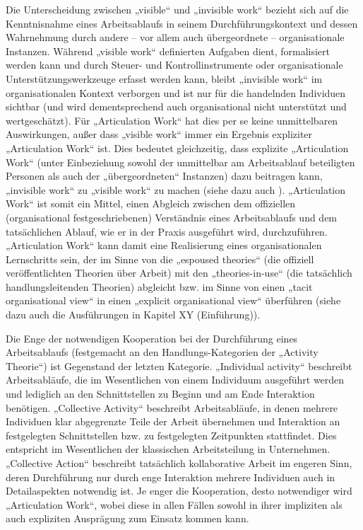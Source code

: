 Die Unterscheidung zwischen „visible“ und „invisible work“ bezieht sich auf die Kenntnisnahme eines Arbeitsablaufs in seinem Durchführungskontext und dessen Wahrnehmung durch andere -- vor allem auch übergeordnete -- organisationale Instanzen. Während „visible work“ definierten Aufgaben dient, formalisiert werden kann und durch Steuer- und Kontrollinstrumente oder organisationale Unterstützungswerkzeuge erfasst werden kann, bleibt „invisible work“ im organisationalen Kontext verborgen und ist nur für die handelnden Individuen sichtbar (und wird dementsprechend auch organisational nicht unterstützt und wertgeschätzt). Für „Articulation Work“ hat dies per se keine unmittelbaren Auswirkungen, außer dass „visible work“ immer ein Ergebnis expliziter „Articulation Work“ ist. Dies bedeutet gleichzeitig, dass explizite „Articulation Work“ (unter Einbeziehung sowohl der unmittelbar am Arbeitsablauf beteiligten Personen als auch der „übergeordneten“ Instanzen) dazu beitragen kann, „invisible work“ zu „visible work“ zu machen (siehe dazu auch \citep{Fujimura87}). „Articulation Work“ ist somit ein Mittel, einen Abgleich zwischen dem offiziellen (organisational festgeschriebenen) Verständnis eines Arbeitsablaufs und dem tatsächlichen Ablauf, wie er in der Praxis ausgeführt wird, durchzuführen. „Articulation Work“ kann damit eine Realisierung eines organisationalen Lernschritts sein, der im Sinne von \citet{Argyris78} die „espoused theories“ (die offiziell veröffentlichten Theorien über Arbeit) mit den „theories-in-use“ (die tatsächlich handlungsleitenden Theorien) abgleicht bzw. im Sinne von \citet{Sachs95} einen „tacit organisational view“ in einen „explicit organisational view“ überführen (siehe dazu auch die Ausführungen in Kapitel XY (Einführung)).

Die Enge der notwendigen Kooperation bei der Durchführung eines Arbeitsablaufs (festgemacht an den Handlungs-Kategorien der „Activity Theorie“) ist Gegenstand der letzten Kategorie. „Individual activity“ beschreibt Arbeitsabläufe, die im Wesentlichen von einem Individuum ausgeführt werden und lediglich an den Schnittstellen zu Beginn und am Ende Interaktion benötigen. „Collective Activity“ beschreibt Arbeitsabläufe, in denen mehrere Individuen klar abgegrenzte Teile der Arbeit übernehmen und Interaktion an festgelegten Schnittstellen bzw. zu festgelegten Zeitpunkten stattfindet. Dies entspricht im Wesentlichen der klassischen Arbeitsteilung in Unternehmen. „Collective Action“ beschreibt tatsächlich kollaborative Arbeit im engeren Sinn, deren Durchführung nur durch enge Interaktion mehrere Individuen auch in Detailaspekten notwendig ist. Je enger die Kooperation, desto notwendiger wird „Articulation Work“, wobei diese in allen Fällen sowohl in ihrer impliziten als auch expliziten Ausprägung zum Einsatz kommen kann. 

